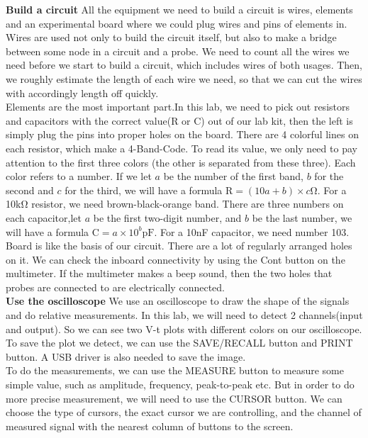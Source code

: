 \hfill \newline
\textbf{Build a circuit} \newline
\phantom{ } All the equipment we need to build a circuit is wires, elements and an experimental board where we could plug wires and pins of elements in.\\
\phantom{ } Wires are used not only to build the circuit itself, but also to make a bridge between some node in a circuit and a probe. We need to count all the wires we need before we start to build a circuit, which includes wires of both usages. Then, we roughly estimate the length of each wire we need, so that we can cut the wires with accordingly length off quickly.\\
\phantom{ } Elements are the most important part.In this lab, we need to pick out resistors and capacitors with the correct value(R or C) out of our lab kit, then the left is simply plug the pins into proper holes on the board. There are 4 colorful lines on each resistor, which make a 4-Band-Code. To read its value, we only need to pay attention to the first three colors (the other is separated from these three). Each color refers to a number. If we let $a$ be the number of the first band, $b$ for the second and $c$ for the third, we will have a formula $\mathrm{R} = (10a+b)\times c\mathrm{\Omega}$. For a 10k$\mathrm{\Omega}$ resistor, we need brown-black-orange band. There are three numbers on each capacitor,let $a$ be the first two-digit number, and $b$ be the last number, we will have a formula $\mathrm{C} = a \times 10^b \mathrm{pF}$. For a 10nF capacitor, we need number 103.\\
\phantom{ } Board is like the basis of our circuit. There are a lot of regularly arranged holes on it. We can check the inboard connectivity by using the Cont button on the multimeter. If the multimeter makes a beep sound, then the two holes that probes are connected to are electrically connected.\\
\textbf{Use the oscilloscope} \newline
\phantom{ } We use an oscilloscope to draw the shape of the signals and do relative measurements. In this lab, we will need to detect 2 channels(input and output). So we can see two V-t plots with different colors on our oscilloscope. To save the plot we detect, we can use the SAVE/RECALL button and PRINT button. A USB driver is also needed to save the image.\\
\phantom{ } To do the measurements, we can use the MEASURE button to measure some simple value, such as amplitude, frequency, peak-to-peak etc. But in order to do more precise measurement, we will need to use the CURSOR button. We can choose the type of cursors, the exact cursor we are controlling, and the channel of measured signal with the nearest column of buttons to the screen.\\

